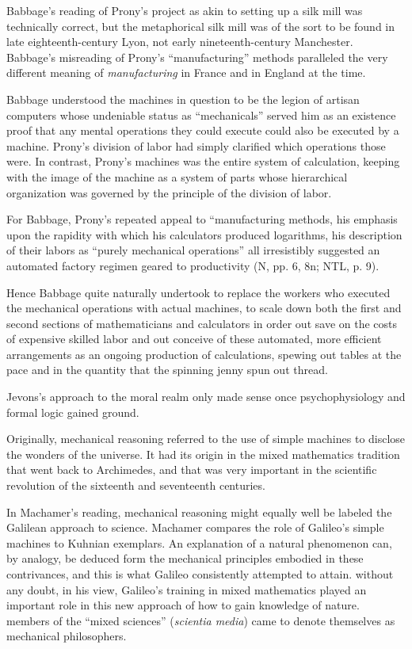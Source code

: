 \documentclass[version=last,draft=true,paper=A4,portrait,twoside=true,twocolumn=false,headinclude=false,footinclude=false,fontsize=12,BCOR=20mm,DIV=calc,pagesize=auto,titlepage=firstiscover,mpinclude=true,open=right,chapterprefix=true,numbers=autoendperiod,headsepline=false,headings=twolinechapter,parskip=false]{scrbook}
\begin{document}
Babbage's reading of Prony's project as akin to setting up a silk mill was
technically correct, but the metaphorical silk mill was of the sort to be
found in late eighteenth-century Lyon, not early nineteenth-century
Manchester. Babbage's misreading of Prony's ``manufacturing'' methods
paralleled the very different meaning of \emph{manufacturing} in France and in
England at the time. 

Babbage understood the machines in question to be the legion of artisan
computers whose undeniable status as ``mechanicals'' served him as an
existence proof that any mental operations they could execute could also be
executed by a machine. Prony's division of labor had simply clarified which
operations those were. In contrast, Prony's machines was the entire system
of calculation, keeping with the image of the machine as a system of parts
whose hierarchical organization was governed by the principle of the
division of labor.

For Babbage, Prony's repeated appeal to ``manufacturing methods, his
emphasis upon the rapidity with which his calculators produced logarithms,
his description of their labors as ``purely mechanical operations'' all
irresistibly suggested an automated factory regimen geared to productivity
(N, pp. 6, 8n; NTL, p. 9).

\begin{displayquote}
Hence Babbage quite naturally undertook to replace the workers who executed
the mechanical operations with actual machines, to scale down both the
first and second sections of mathematicians and calculators in order out
save on the costs of expensive skilled labor and out conceive of these
automated, more efficient arrangements as an ongoing production of
calculations, spewing out tables at the pace and in the quantity that the
spinning jenny spun out thread.
\end{displayquote}

Jevons's approach to the moral realm only made sense once psychophysiology
and formal logic gained ground.

Originally, mechanical reasoning referred to the use of simple machines to
disclose the wonders of the universe. It had its origin in the mixed
mathematics tradition that went back to Archimedes, and that was very
important in the scientific revolution of the sixteenth and seventeenth
centuries. 

In Machamer's reading, mechanical reasoning might equally well be labeled
the Galilean approach to science. Machamer compares the role of Galileo's
simple machines to Kuhnian exemplars. An explanation of a natural
phenomenon can, by analogy, be deduced form the mechanical principles
embodied in these contrivances, and this is what Galileo consistently
attempted to attain. without any doubt, in his view, Galileo's training in
mixed mathematics played an important role in this new approach of how to
gain knowledge of nature. members of the ``mixed sciences'' (\emph{scientia
media}) came to denote themselves as mechanical philosophers.
\end{document}
